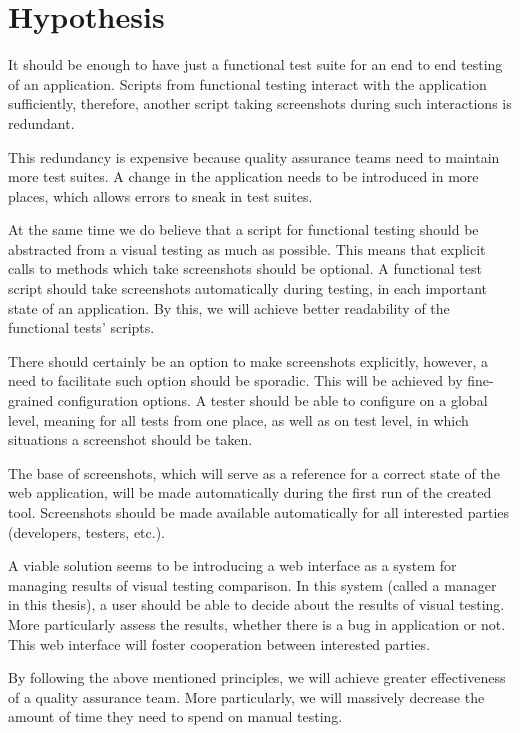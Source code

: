 \documentclass[11pt,oneside,final]{fithesis2}
\begin{document}
  \section{Hypothesis}
  \label{sec:hypothesis}
  It should be enough to have just a functional test suite for an end to end testing of an application. Scripts from functional testing interact with the application sufficiently, 
  therefore, another script taking screenshots during such interactions is redundant.
  
  This redundancy is expensive because quality assurance teams need to maintain more test suites. A change in the application needs to be introduced in more places, which allows errors to
  sneak in test suites.
  
  At the same time we do believe that a script for functional testing should be abstracted from a visual testing as much as possible. This means that explicit calls to methods which 
  take screenshots should be optional. A functional test script should take screenshots automatically during testing, in each important state of an application. By this, we will achieve better
  readability of the functional tests' scripts.
  
  There should certainly be an option to make screenshots explicitly, however, a need to facilitate such option should be sporadic. This will be achieved by fine-grained configuration options.
  A tester should be able to configure on a global level, meaning for all tests from one place, as well as on test level, in which situations a screenshot should be taken.
  
  The base of screenshots, which will serve as a reference for a correct state of the web application, will be made automatically during the first run of the created tool. 
  Screenshots should be made available automatically for all interested parties (developers, testers, etc.).
  
  A viable solution seems to be introducing a web interface as a system for managing results of visual testing comparison. In this system (called a manager in this thesis), a user should be
  able to decide about the results of visual testing. More particularly assess the results, whether there is a bug in application or not. 
  This web interface will foster cooperation between interested parties.
  
  By following the above mentioned principles, we will achieve greater effectiveness of a quality assurance team. More particularly, we will massively decrease the amount of time they need to spend 
  on manual testing.
  
\end{document}
